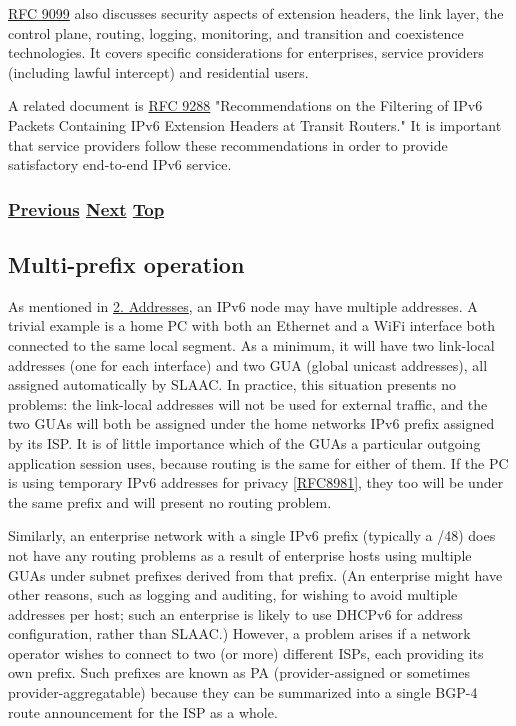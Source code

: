 \documentclass[
]{article}
\begin{document}
\href{https://www.rfc-editor.org/info/rfc9099}{RFC 9099} also discusses
security aspects of extension headers, the link layer, the control
plane, routing, logging, monitoring, and transition and coexistence
technologies. It covers specific considerations for enterprises, service
providers (including lawful intercept) and residential users.

A related document is \href{https://www.rfc-editor.org/info/rfc9288}{RFC
9288} "Recommendations on the Filtering of IPv6 Packets Containing IPv6
Extension Headers at Transit Routers." It is important that service
providers follow these recommendations in order to provide satisfactory
end-to-end IPv6 service.

\subsubsection{\texorpdfstring{\hyperref[routing-operation]{Previous}
\hyperref[multi-prefix-operation]{Next}
\hyperref[management-and-operations]{Top}}{Previous Next Top}}\label{previous-next-top-29}

\pagebreak

\subsection{Multi-prefix operation}\label{multi-prefix-operation}

As mentioned in \hyperref[addresses]{2. Addresses}, an IPv6 node may
have multiple addresses. A trivial example is a home PC with both an
Ethernet and a WiFi interface both connected to the same local segment.
As a minimum, it will have two link-local addresses (one for each
interface) and two GUA (global unicast addresses), all assigned
automatically by SLAAC. In practice, this situation presents no
problems: the link-local addresses will not be used for external
traffic, and the two GUAs will both be assigned under the home
network\textquotesingle s IPv6 prefix assigned by its ISP. It is of
little importance which of the GUAs a particular outgoing application
session uses, because routing is the same for either of them. If the PC
is using temporary IPv6 addresses for privacy
{[}\href{https://www.rfc-editor.org/info/rfc8981}{RFC8981}{]}, they too
will be under the same prefix and will present no routing problem.

Similarly, an enterprise network with a single IPv6 prefix (typically a
/48) does not have any routing problems as a result of enterprise hosts
using multiple GUAs under subnet prefixes derived from that prefix. (An
enterprise might have other reasons, such as logging and auditing, for
wishing to avoid multiple addresses per host; such an enterprise is
likely to use DHCPv6 for address configuration, rather than SLAAC.)
However, a problem arises if a network operator wishes to connect to two
(or more) different ISPs, each providing its own prefix. Such prefixes
are known as PA (provider-assigned or sometimes provider-aggregatable)
because they can be summarized into a single BGP-4 route announcement
for the ISP as a whole.
\end{document}
